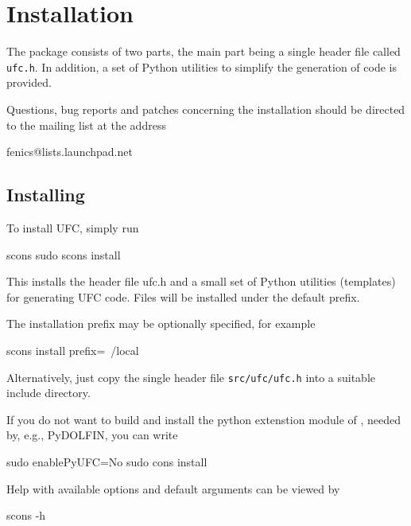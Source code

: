\chapter{Installation}
\label{app:installation}

The \ufc{} package consists of two parts, the main part being a single
header file called \texttt{ufc.h}. In addition, a set of Python
utilities to simplify the generation of \ufc{} code is provided.

Questions, bug reports and patches concerning the installation should
be directed to the \ufc{} mailing list at the address
\begin{code}
fenics@lists.launchpad.net
\end{code}

\section{Installing \ufc{}}

To install UFC, simply run
\begin{code}
scons
sudo scons install
\end{code}

This installs the header file ufc.h and a small set of Python
utilities (templates) for generating UFC code. Files will be installed
under the default prefix.

The installation prefix may be optionally specified, for example

\begin{code}
scons install prefix=~/local
\end{code}

Alternatively, just copy the single header file \texttt{src/ufc/ufc.h}
into a suitable include directory.

If you do not want to build and install the python extenstion module of \ufc{},
needed by, e.g., PyDOLFIN, you can write

\begin{code}
sudo enablePyUFC=No
sudo cons install
\end{code}

Help with available options and default arguments can be viewed by
\begin{code}
scons -h
\end{code}
